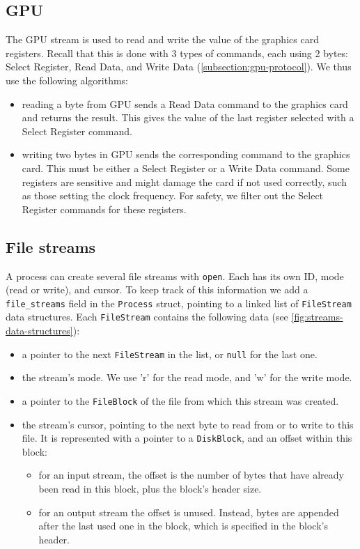 \subsection{GPU}

The GPU stream is used to read and write the value of the graphics card
registers. Recall that this is done with 3 types of commands, each using 2
bytes: Select Register, Read Data, and Write Data
(\cref{subsection:gpu-protocol}). We thus use the following algorithms:
\begin{itemize}
  \item reading a byte from GPU sends a Read Data command to the graphics card
  and returns the result. This gives the value of the last register selected
  with a Select Register command.

  \item writing two bytes in GPU sends the corresponding command to the
  graphics card. This must be either a Select Register or a Write Data command.
  Some registers are sensitive and might damage the card if not used correctly,
  such as those setting the clock frequency. For safety, we filter out the
  Select Register commands for these registers.
\end{itemize}

\subsection{File streams}\label{subsection:file-streams}

A process can create several file streams with {\tt open}. Each has its own ID,
mode (read or write), and cursor. To keep track of this information we add a
{\tt file\_streams} field in the {\tt Process} struct, pointing to a linked
list of {\tt FileStream} data structures. Each {\tt FileStream} contains the
following data (see \cref{fig:streams-data-structures}):
\begin{itemize}
  \item a pointer to the next {\tt FileStream} in the list, or {\tt null} for
  the last one.

  \item the stream's mode. We use 'r' for the read mode, and 'w' for the
  write mode.

  \item a pointer to the {\tt FileBlock} of the file from which this stream was
  created.

  \item the stream's cursor, pointing to the next byte to read from or to write
  to this file. It is represented with a pointer to a {\tt DiskBlock}, and an
  offset within this block:
  \begin{itemize}
    \item for an input stream, the offset is the number of bytes that have
    already been read in this block, plus the block's header size.

    \item for an output stream the offset is unused. Instead, bytes are
    appended after the last used one in the block, which is specified in the
    block's header.
  \end{itemize}
\end{itemize}

